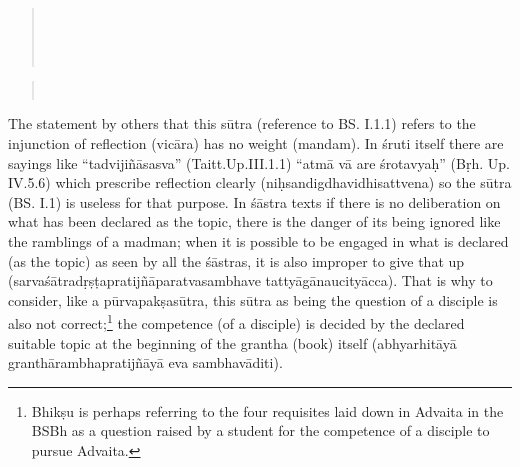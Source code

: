 \begin{verse}
\\
\\
\\
\end{verse}
\begin{verse}
\\
\end{verse}

The statement by others that this sūtra (reference to BS. I.1.1) refers to the injunction of reflection  (vicāra) has no weight (mandam). In śruti itself there are sayings like “tadvijiñāsasva” (Taitt.Up.III.1.1) “atmā vā are śrotavyaḥ” (Bṛh. Up. IV.5.6) which prescribe reflection clearly (niḥsandigdhavidhisattvena) so the sūtra (BS. I.1) is useless for that purpose. In śāstra texts if there is no deliberation on what has been declared as the topic, there is the danger of its being ignored like the ramblings of a madman; when it is possible to be engaged in what is declared (as the topic) as seen by all the śāstras, it is also improper to give that up (sarvaśātradṛṣṭapratijñāparatvasambhave tattyāgānaucityācca). That is why to consider, like a pūrvapakṣasūtra, this sūtra as being the question of a disciple is also not correct;\footnote{Bhikṣu is perhaps referring to the four requisites laid down in Advaita in the BSBh as a question raised by a student for the competence of a disciple to pursue Advaita.} the competence (of a disciple) is decided by the declared suitable topic at the beginning of the grantha (book) itself (abhyarhitāyā granthārambhapratijñāyā eva sambhavāditi).

